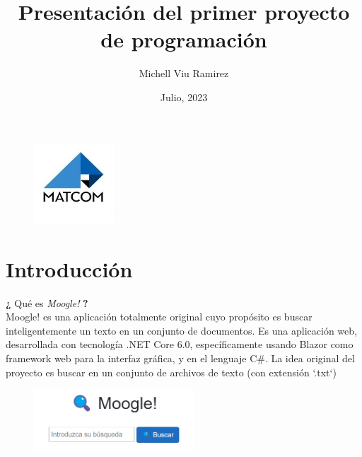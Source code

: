 \documentclass{article}
\begin{document}
\title{Presentación del primer proyecto de programación}
\author{Michell Viu Ramirez}
\date{Julio, 2023}
\maketitle

\begin{figure}[h]
    \centering
    \includegraphics[width=3cm]{matcom.jpg}
\end{figure}

\newpage
\tableofcontents

\newpage
\section{Introducción}
\textbf{¿} Qué es \textit{Moogle!} \textbf{?}\\
Moogle! es una aplicación totalmente original cuyo propósito es buscar 
inteligentemente un texto en un conjunto de documentos.
Es una aplicación web, desarrollada con tecnología .NET Core 6.0, específicamente 
usando Blazor como framework web para la interfaz gráfica, y en el lenguaje C\#.
La idea original del proyecto es buscar en un conjunto de archivos de texto (con extensión `.txt`)

\begin{figure}[h]
    \centering
    \includegraphics[width=6cm]{Moogle.png}
\end{figure}
\end{document}
